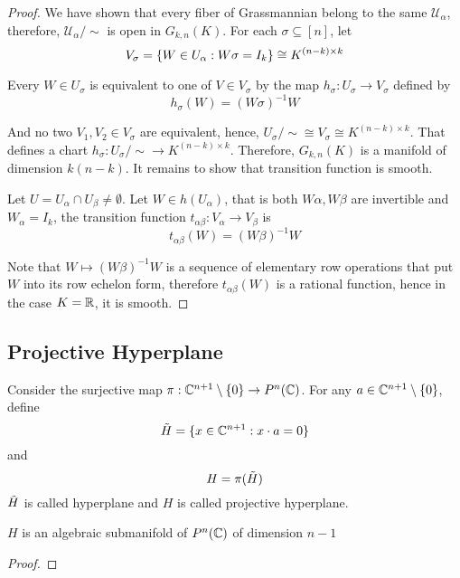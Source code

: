 \begin{proposition}
\begin{proof}
		We have shown that every fiber of Grassmannian belong to the same $\mathcal{U}_\alpha$, therefore, $\mathcal{U}_\alpha / \sim$ is open in $G_{k, n}(K)$. For each $\sigma \subseteq [n]$, let
		$$
		V_\sigma = \{W \in U_\alpha: W\sigma = I_k\} \cong K^{(n-k) \times k}
		$$
		
		Every $W \in U_\sigma$ is equivalent to one of $V \in V_\sigma$ by the map $h_\sigma: U_\sigma \to V_\sigma$ defined by
		$$
		h_\sigma(W) = (W \sigma)^{-1} W
		$$
		
		And no two $V_1, V_2 \in V_\sigma$ are equivalent, hence, $U_\sigma / \sim \cong V_\sigma \cong K^{(n-k) \times k}$. That defines a chart $h_\sigma: U_\sigma/\sim \to K^{(n-k) \times k}$. Therefore, $G_{k, n}(K)$ is a manifold of dimension $k(n-k)$. It remains to show that transition function is smooth.
		
		Let $U = U_\alpha \cap U_\beta \neq \emptyset$. Let $W \in h(U_\alpha)$, that is both $W \alpha, W \beta$ are invertible and $W_\alpha = I_k$, the transition function $t_{\alpha \beta}: V_\alpha \to V_\beta$ is
		$$
		t_{\alpha \beta}(W) = (W \beta)^{-1} W
		$$
		
		Note that $W \mapsto (W \beta)^{-1} W$ is a sequence of elementary row operations that put $W$ into its row echelon form, therefore $t_{\alpha \beta}(W)$ is a rational function, hence in the case $K = \mathbb{R}$, it is smooth.
	\end{proof}
\end{proposition}

\subsection{Projective Hyperplane}

\begin{definition}
	Consider the surjective map $\pi: \mathbb{C}^{n+1} \setminus \{0\} \to P^n(\mathbb{C})$. For any $a \in \mathbb{C}^{n+1} \setminus \{0\}$, define 
	$$
	\Tilde{H} = \{x \in \mathbb{C}^{n+1}: x \cdot a = 0\}
	$$
	and
	$$
	H = \pi(\Tilde{H})
	$$
	$\Tilde{H}$ is called hyperplane and $H$ is called projective hyperplane.
\end{definition}

\begin{proposition}
	$H$ is an algebraic submanifold of $P^n(\mathbb{C})$ of dimension $n-1$
	\begin{proof}
	\end{proof}
\end{proposition}


